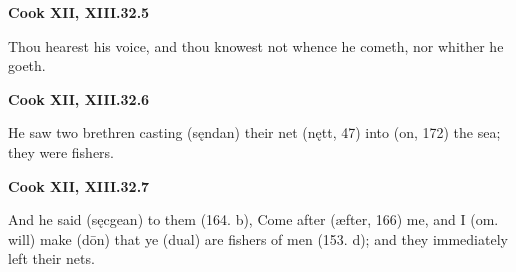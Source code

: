 \par\begin{minipage}{\linewidth}\raggedright
\textbf{Cook XII, XIII.32.5}

Thou hearest his voice, and thou knowest not whence he cometh, nor whither he goeth.

\end{minipage}\par\addvspace{4pt}

\par\begin{minipage}{\linewidth}\raggedright
\textbf{Cook XII, XIII.32.6}

He saw two brethren casting (sęndan) their net (nętt, 47) into (on, 172) the sea; they were fishers.

\end{minipage}\par\addvspace{4pt}

\par\begin{minipage}{\linewidth}\raggedright
\textbf{Cook XII, XIII.32.7}

And he said (sęcgean) to them (164. b), Come after (æfter, 166) me, and I (om. will) make (dōn) that ye (dual) are fishers of men (153. d); and they immediately left their nets.

\end{minipage}\par\addvspace{4pt}

